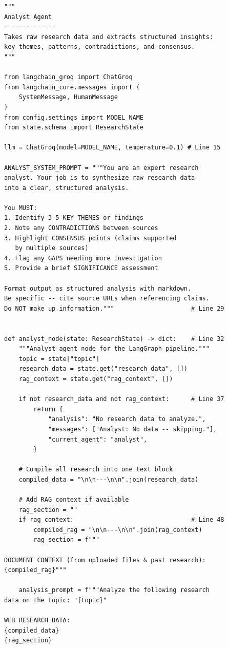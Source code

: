 \documentclass[12pt, a4paper]{article}
\begin{document}
\begin{lstlisting}[style=pythonstyle, title={\color{accentgreen}\faIcon{file} agents/analyst.py --- Full Code (85 lines)}]
"""
Analyst Agent
--------------
Takes raw research data and extracts structured insights:
key themes, patterns, contradictions, and consensus.
"""

from langchain_groq import ChatGroq
from langchain_core.messages import (
    SystemMessage, HumanMessage
)
from config.settings import MODEL_NAME
from state.schema import ResearchState

llm = ChatGroq(model=MODEL_NAME, temperature=0.1) # Line 15

ANALYST_SYSTEM_PROMPT = """You are an expert research
analyst. Your job is to synthesize raw research data
into a clear, structured analysis.

You MUST:
1. Identify 3-5 KEY THEMES or findings
2. Note any CONTRADICTIONS between sources
3. Highlight CONSENSUS points (claims supported
   by multiple sources)
4. Flag any GAPS needing more investigation
5. Provide a brief SIGNIFICANCE assessment

Format output as structured analysis with markdown.
Be specific -- cite source URLs when referencing claims.
Do NOT make up information."""                     # Line 29


def analyst_node(state: ResearchState) -> dict:    # Line 32
    """Analyst agent node for the LangGraph pipeline."""
    topic = state["topic"]
    research_data = state.get("research_data", [])
    rag_context = state.get("rag_context", [])

    if not research_data and not rag_context:      # Line 37
        return {
            "analysis": "No research data to analyze.",
            "messages": ["Analyst: No data -- skipping."],
            "current_agent": "analyst",
        }

    # Compile all research into one text block
    compiled_data = "\n\n---\n\n".join(research_data)

    # Add RAG context if available
    rag_section = ""
    if rag_context:                                # Line 48
        compiled_rag = "\n\n---\n\n".join(rag_context)
        rag_section = f"""

DOCUMENT CONTEXT (from uploaded files & past research):
{compiled_rag}"""

    analysis_prompt = f"""Analyze the following research
data on the topic: "{topic}"

WEB RESEARCH DATA:
{compiled_data}
{rag_section}


\end{lstlisting}
\end{document}
